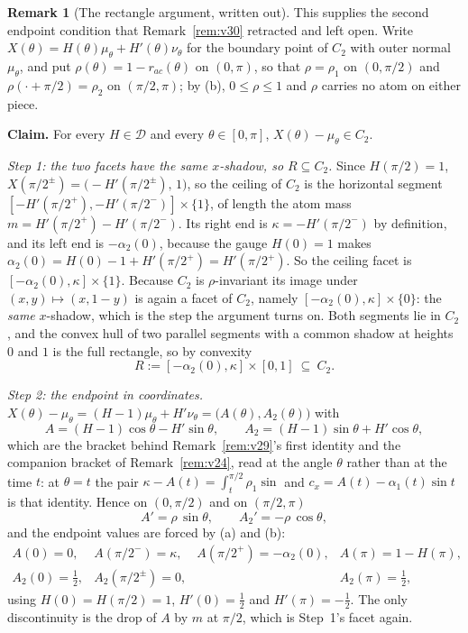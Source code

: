 \documentclass[11pt]{article}
\theoremstyle{definition}
\newtheorem{remark}[theorem]{Remark}
\begin{document}
\begin{remark}[The rectangle argument, written out]\label{rem:v31}
This supplies the second endpoint condition that Remark~\ref{rem:v30} retracted and left
open. Write $X(\theta)=H(\theta)\mu_\theta+H'(\theta)\nu_\theta$ for the boundary point of
$C_2$ with outer normal $\mu_\theta$, and put $\rho(\theta)=1-r_{ac}(\theta)$ on $(0,\pi)$, so
that $\rho=\rho_1$ on $(0,\pi/2)$ and $\rho(\cdot+\pi/2)=\rho_2$ on $(\pi/2,\pi)$; by (b),
$0\le\rho\le1$ and $\rho$ carries no atom on either piece.

\textbf{Claim.} For every $H\in\mathcal D$ and every $\theta\in[0,\pi]$,
$X(\theta)-\mu_\theta\in C_2$.

\emph{Step 1: the two facets have the same $x$-shadow, so $R\subseteq C_2$.} Since
$H(\pi/2)=1$, $X(\pi/2^\pm)=\bigl(-H'(\pi/2^\pm),\,1\bigr)$, so the ceiling of $C_2$ is the
horizontal segment $[-H'(\pi/2^+),-H'(\pi/2^-)]\times\{1\}$, of length the atom mass
$m=H'(\pi/2^+)-H'(\pi/2^-)$. Its right end is $\kappa=-H'(\pi/2^-)$ by definition, and its
left end is $-\alpha_2(0)$, because the gauge $H(0)=1$ makes
$\alpha_2(0)=H(0)-1+H'(\pi/2^+)=H'(\pi/2^+)$. So the ceiling facet is
$[-\alpha_2(0),\kappa]\times\{1\}$. Because $C_2$ is $\rho$-invariant its image under
$(x,y)\mapsto(x,1-y)$ is again a facet of $C_2$, namely $[-\alpha_2(0),\kappa]\times\{0\}$:
the \emph{same} $x$-shadow, which is the step the argument turns on. Both segments lie in
$C_2$, and the convex hull of two parallel segments with a common shadow at heights $0$ and
$1$ is the full rectangle, so by convexity
\[
  R:=[-\alpha_2(0),\kappa]\times[0,1]\ \subseteq\ C_2 .
\]

\emph{Step 2: the endpoint in coordinates.} $X(\theta)-\mu_\theta=(H-1)\mu_\theta+H'\nu_\theta
=\bigl(A(\theta),A_2(\theta)\bigr)$ with
\[
  A=(H-1)\cos\theta-H'\sin\theta ,\qquad A_2=(H-1)\sin\theta+H'\cos\theta ,
\]
which are the bracket behind Remark~\ref{rem:v29}'s first identity and the companion bracket
of Remark~\ref{rem:v24}, read at the angle $\theta$ rather than at the time $t$: at
$\theta=t$ the pair $\kappa-A(t)=\int_t^{\pi/2}\rho_1\sin$ and $c_x=A(t)-\alpha_1(t)\sin t$
is that identity. Hence on $(0,\pi/2)$ and on $(\pi/2,\pi)$
\[
  A'=\rho\,\sin\theta ,\qquad A_2'=-\rho\,\cos\theta ,
\]
and the endpoint values are forced by (a) and (b):
\[
  \begin{array}{llll}
    A(0)=0, & A(\pi/2^-)=\kappa, & A(\pi/2^+)=-\alpha_2(0), & A(\pi)=1-H(\pi),\\[2pt]
    A_2(0)=\tfrac12, & A_2(\pi/2^\pm)=0, & & A_2(\pi)=\tfrac12 ,
  \end{array}
\]
using $H(0)=H(\pi/2)=1$, $H'(0)=\tfrac12$ and $H'(\pi)=-\tfrac12$. The only discontinuity is
the drop of $A$ by $m$ at $\pi/2$, which is Step~1's facet again.


\end{remark}
\end{document}
